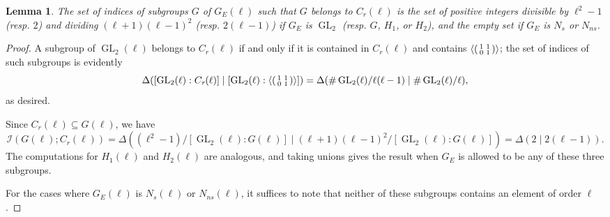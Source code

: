 \documentclass[table,dvipsnames]{amsart}
\newcommand{\GL}{\operatorname{GL}}
\newcommand{\I}{\mathcal{I}}
\newcommand{\angles}[1]{\langle #1\rangle}
\newcommand{\smallmat}[4]{\begin{psmallmatrix}#1&#2\\#3&#4\end{psmallmatrix}}
\newtheorem{lemma}[theorem]{Lemma}
\numberwithin{equation}{section}
\newcommand{\s}{\textit{s}}
\newcommand{\ns}{\textit{ns}}
\newcommand{\Cr}{C_{\textit{r}}}
\newcommand{\Ns}{N_\s}
\newcommand{\Nns}{N_\ns}
\begin{document}
\begin{lemma}
\label{lem:A}
The set of indices of subgroups $G$ of $G_E(\ell)$ such that $G$ belongs to $\Cr(\ell)$ is the set of positive integers divisible by $\ell^2-1$ (resp. $2$) and dividing $(\ell+1)(\ell-1)^2$ (resp. $2(\ell-1)$) if $G_E$ is $\GL_2$ (resp. $G$, $H_1$, or $H_2$), and the empty set if $G_E$ is $\Ns$ or $\Nns$. 
\end{lemma}
\begin{proof}
A subgroup of $\GL_2(\ell)$ belongs to $\Cr(\ell)$ if and only if it is contained in $\Cr(\ell)$ and contains $\angles{\smallmat{1}{1}{0}{1}}$; the set of indices of such subgroups is evidently
\begin{equation*}
\Delta([\GL_2(\ell):\Cr(\ell)]\mid[\GL_2(\ell):\angles{\smallmat{1}{1}{0}{1}}])=\Delta(\#\GL_2(\ell)/\ell(\ell-1)\mid \#\GL_2(\ell)/\ell),
\end{equation*}
as desired.

Since $\Cr(\ell)\subseteq G(\ell)$, we have
\begin{equation*}
\I(G(\ell);\Cr(\ell))=\Delta((\ell^2-1)/[\GL_2(\ell):G(\ell)]\mid(\ell+1)(\ell-1)^2/[\GL_2(\ell):G(\ell)])=\Delta(2\mid 2(\ell-1)).
\end{equation*}
The computations for $H_1(\ell)$ and $H_2(\ell)$ are analogous, and taking unions gives the result when $G_E$ is allowed to be any of these three subgroups.

For the cases where $G_E(\ell)$ is $\Ns(\ell)$ or $\Nns(\ell)$, it suffices to note that neither of these subgroups contains an element of order $\ell$.
\end{proof}
\end{document}
